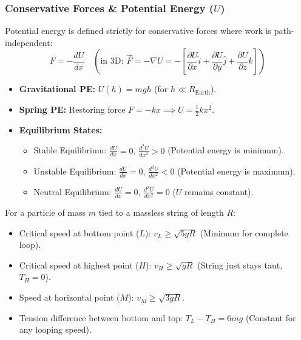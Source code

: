 \documentclass[11pt,a4paper]{article}
\begin{document}
\subsubsection{Conservative Forces \& Potential Energy ($U$)}
Potential energy is defined strictly for conservative forces where work is path-independent:
\[
  F = -\frac{dU}{dx} \quad \left(\text{in 3D: } \vec{F} = -\nabla U = -\left[\frac{\partial U}{\partial x}\hat{i} + \frac{\partial U}{\partial y}\hat{j} + \frac{\partial U}{\partial z}\hat{k}\right]\right)
\]
\begin{itemize}[leftmargin=1.5em, itemsep=2pt]
  \item \textbf{Gravitational PE:} $U(h) = mgh$ (for $h \ll R_{\text{Earth}}$).
  \item \textbf{Spring PE:} Restoring force $F = -kx \implies U = \frac{1}{2} k x^2$.
  \item \textbf{Equilibrium States:}
  \begin{itemize}[label=$\circ$]
    \item Stable Equilibrium: $\frac{dU}{dx} = 0$, $\frac{d^2U}{dx^2} > 0$ (Potential energy is minimum).
    \item Unstable Equilibrium: $\frac{dU}{dx} = 0$, $\frac{d^2U}{dx^2} < 0$ (Potential energy is maximum).
    \item Neutral Equilibrium: $\frac{dU}{dx} = 0$, $\frac{d^2U}{dx^2} = 0$ ($U$ remains constant).
  \end{itemize}
\end{itemize}

\begin{formulabox}
For a particle of mass $m$ tied to a massless string of length $R$:
\begin{itemize}[leftmargin=1.2em, itemsep=2pt]
  \item Critical speed at bottom point ($L$): $v_L \ge \sqrt{5gR}$ (Minimum for complete loop).
  \item Critical speed at highest point ($H$): $v_H \ge \sqrt{gR}$ (String just stays taut, $T_H = 0$).
  \item Speed at horizontal point ($M$): $v_M \ge \sqrt{3gR}$.
  \item Tension difference between bottom and top: $T_L - T_H = 6mg$ (Constant for any looping speed).
\end{itemize}
\end{formulabox}
\end{document}
